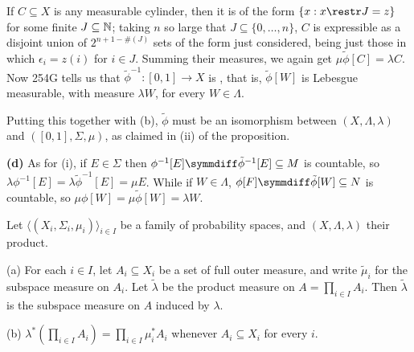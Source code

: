 {If $C\subseteq X$ is any measurable cylinder, then it is of the form
$\{x:x\restr J=z\}$ for some finite $J\subseteq\Bbb N$;  taking $n$ so
large that $J\subseteq\{0,\ldots,n\}$, $C$ is expressible as a disjoint
union of $2^{n+1-\#(J)}$ sets of the form just considered, being just
those in which $\epsilon_i=z(i)$ for $i\in J$.   Summing their measures,
we again get $\mu\tilde\phi[C]=\lambda C$.   Now 254G tells us that
$\tilde\phi^{-1}:[0,1]\to X$ is \imp, that is, $\tilde\phi[W]$ is
Lebesgue measurable, with measure $\lambda W$, for every $W\in\Lambda$.

Putting this together with (b), $\tilde\phi$ must be an isomorphism
between $(X,\Lambda,\lambda)$ and $([0,1],\Sigma,\mu)$, as claimed in
(ii) of the proposition.

\medskip

{\bf (d)} As for (i), if $E\in\Sigma$ then
$\phi^{-1}[E]\symmdiff\tilde\phi^{-1}[E]\subseteq M$ is countable, so
$\lambda\phi^{-1}[E]=\lambda\tilde\phi^{-1}[E]=\mu E$.   While if
$W\in\Lambda$, $\phi[F]\symmdiff\tilde\phi[W]\subseteq N$ is countable,
so $\mu\phi[W]=\mu\tilde\phi[W]=\lambda W$.
}%

 Let
$\langle(X_i,\Sigma_i,\mu_i)\rangle_{i\in I}$
be a family of probability spaces, and $(X,\Lambda,\lambda)$ their
product.

(a) For each $i\in I$, let $A_i\subseteq X_i$ be a set of full outer
measure, and write $\tilde\mu_i$ for the subspace measure on
$A_i$.
Let $\tilde\lambda$ be the product measure on $A=\prod_{i\in I}A_i$.
Then $\tilde\lambda$ is the subspace measure on $A$ induced by
$\lambda$.

(b) $\lambda^*(\prod_{i\in I}A_i)=\prod_{i\in I}\mu_i^*A_i$ whenever
$A_i\subseteq X_i$ for every $i$.

